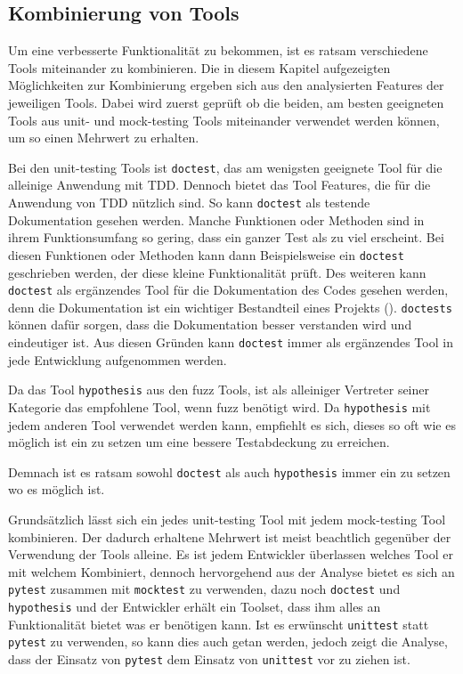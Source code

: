 \subsection{Kombinierung von Tools}\label{kombinierung}
Um eine verbesserte Funktionalität zu bekommen, ist es ratsam verschiedene
Tools miteinander zu kombinieren. Die in diesem Kapitel aufgezeigten
Möglichkeiten zur Kombinierung ergeben sich aus den analysierten Features der
jeweiligen Tools. Dabei wird zuerst geprüft ob die beiden, am besten geeigneten
Tools aus unit- und \gls{mock}-testing Tools miteinander verwendet werden
können, um so einen Mehrwert zu erhalten.

Bei den unit-testing Tools ist \lstinline{doctest}, das am wenigsten geeignete
Tool für die alleinige Anwendung mit TDD. Dennoch bietet das Tool Features, die
für die Anwendung von TDD nützlich sind. So kann \lstinline{doctest} als
testende Dokumentation gesehen werden. Manche Funktionen oder Methoden sind in
ihrem Funktionsumfang so gering, dass ein ganzer Test als zu viel erscheint.
Bei diesen Funktionen oder Methoden kann dann Beispielsweise ein
\lstinline{doctest} geschrieben werden, der diese kleine Funktionalität prüft.
Des weiteren kann \lstinline{doctest} als ergänzendes Tool für die
Dokumentation des Codes gesehen werden, denn die Dokumentation ist ein
wichtiger Bestandteil eines Projekts (\cite{python.org:PEP8}).
\lstinline{doctests} können dafür sorgen, dass die Dokumentation besser
verstanden wird und eindeutiger ist. Aus diesen Gründen kann
\lstinline{doctest} immer als ergänzendes Tool in jede Entwicklung aufgenommen
werden.

Da das Tool \lstinline{hypothesis} aus den \gls{fuzz} Tools, ist als alleiniger
Vertreter seiner Kategorie das empfohlene Tool, wenn \gls{fuzz} benötigt wird.
Da \lstinline{hypothesis} mit jedem anderen Tool verwendet werden kann,
empfiehlt es sich, dieses so oft wie es möglich ist ein zu setzen um eine
bessere Testabdeckung zu erreichen.

Demnach ist es ratsam sowohl \lstinline{doctest} als auch
\lstinline{hypothesis} immer ein zu setzen wo es möglich ist.
\newline

Grundsätzlich lässt sich ein jedes unit-testing Tool mit jedem 
\gls{mock}-testing Tool kombinieren. Der dadurch erhaltene Mehrwert ist meist 
beachtlich gegenüber der Verwendung der Tools alleine. Es ist jedem Entwickler 
überlassen welches Tool er mit welchem Kombiniert, dennoch hervorgehend aus der 
Analyse bietet es sich an \lstinline{pytest} zusammen mit \lstinline{mocktest} 
zu verwenden, dazu noch \lstinline{doctest} und \lstinline{hypothesis} und der 
Entwickler erhält ein Toolset, dass ihm alles an Funktionalität bietet was er 
benötigen kann. Ist es erwünscht \lstinline{unittest} statt \lstinline{pytest} 
zu verwenden, so kann dies auch getan werden, jedoch zeigt die Analyse, dass 
der Einsatz von \lstinline{pytest} dem Einsatz von \lstinline{unittest} vor zu 
ziehen ist.
